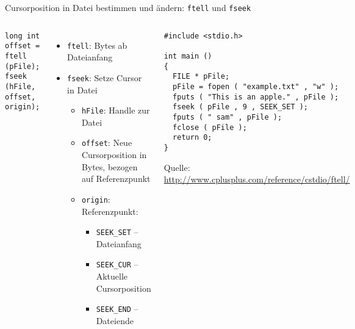 \begin{frame}[fragile]{Cursorposition in Datei bestimmen und ändern: \texttt{ftell} und \texttt{fseek}}
%
\vspace{-20pt}
\begin{columns}[T]
\begin{codebox}[Syntax]
\begin{verbatim}
long int offset = ftell (pFile);
fseek (hFile, offset, origin);
\end{verbatim}
\end{codebox}
%
\begin{itemize}
\item \texttt{ftell}: Bytes ab Dateianfang
\item \texttt{fseek}: Setze Cursor in Datei
	\begin{itemize}
	\item \texttt{hFile}: Handle zur Datei
	\item \texttt{offset}: Neue Cursorposition in Bytes, bezogen auf Referenzpunkt
	\item \texttt{origin}: Referenzpunkt:
		\begin{itemize}
		\item \texttt{SEEK\_SET} -- Dateianfang
		\item \texttt{SEEK\_CUR} -- Aktuelle Cursorposition
		\item \texttt{SEEK\_END} -- Dateiende
		\end{itemize}
	\end{itemize}
\end{itemize}
%
\begin{codebox}
\begin{verbatim}
#include <stdio.h>

int main ()
{
  FILE * pFile;
  pFile = fopen ( "example.txt" , "w" );
  fputs ( "This is an apple." , pFile );
  fseek ( pFile , 9 , SEEK_SET );
  fputs ( " sam" , pFile );
  fclose ( pFile );
  return 0;
}
\end{verbatim}
\tiny Quelle:\newline
	\url{http://www.cplusplus.com/reference/cstdio/ftell/}
\end{codebox}
\end{columns}
%
\end{frame}


